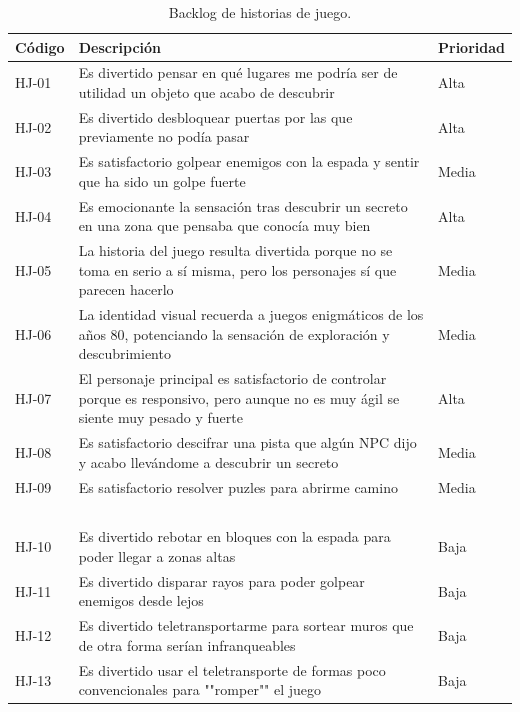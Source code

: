 \begin{table}[htb]
    \centering
    \begin{tabular}{|l|p{10cm}|l|}
    \hline
        Código & Descripción & Prioridad \\ \hline
        HJ-01 & Es divertido pensar en qué lugares me podría ser de utilidad un objeto que acabo de descubrir & Alta \\ \hline
        HJ-02 & Es divertido desbloquear puertas por las que previamente no podía pasar & Alta \\ \hline
        HJ-03 & Es satisfactorio golpear enemigos con la espada y sentir que ha sido un golpe fuerte & Media \\ \hline
        HJ-04 & Es emocionante la sensación tras descubrir un secreto en una zona que pensaba que conocía muy bien & Alta \\ \hline
        HJ-05 & La historia del juego resulta divertida porque no se toma en serio a sí misma, pero los personajes sí que parecen hacerlo & Media \\ \hline
        HJ-06 & La identidad visual recuerda a juegos enigmáticos de los años 80, potenciando la sensación de exploración y descubrimiento & Media \\ \hline
        HJ-07 & El personaje principal es satisfactorio de controlar porque es responsivo, pero aunque no es muy ágil se siente muy pesado y fuerte & Alta \\ \hline
        HJ-08 & Es satisfactorio descifrar una pista que algún NPC dijo y acabo llevándome a descubrir un secreto & Media \\ \hline
        HJ-09 & Es satisfactorio resolver puzles para abrirme camino & Media \\ \hline
        ~ & ~ & ~ \\ \hline
        HJ-10 & Es divertido rebotar en bloques con la espada para poder llegar a zonas altas & Baja \\ \hline
        HJ-11 & Es divertido disparar rayos para poder golpear enemigos desde lejos & Baja \\ \hline
        HJ-12 & Es divertido teletransportarme para sortear muros que de otra forma serían infranqueables & Baja \\ \hline
        HJ-13 & Es divertido usar el teletransporte de formas poco convencionales para ""romper"" el juego & Baja \\ \hline
    \end{tabular}
    \caption{Backlog de historias de juego.}
    \label{tab:backloghj}
\end{table}

